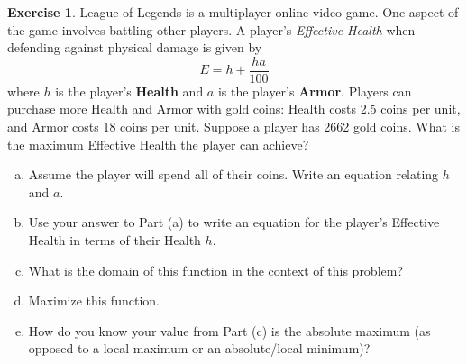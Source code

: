 \documentclass[11pt,reqno,final]{amsart}
\numberwithin{figure}{section}
\theoremstyle{definition} %
\newtheorem{exercise}[question]{Exercise}
\begin{document}
\begin{exercise}
        League of Legends is a multiplayer online video game. One aspect of the game involves battling other players.
        A player's \textit{Effective Health} when defending against physical damage is given by
        \[
                E = h + \dfrac{ha}{100}
        \]
        where $h$ is the player's \textbf{Health} and $a$ is the player's \textbf{Armor}.
        Players can purchase more Health and Armor with gold coins: Health costs 2.5 coins per unit, and Armor costs 18 coins per unit.
        Suppose a player has 2662 gold coins.
        What is the maximum Effective Health the player can achieve?
        \begin{enumerate}[(a)]
        \item Assume the player will spend all of their coins. Write an equation relating $h$ and $a$.
                \vfill
        \item Use your answer to Part (a) to write an equation for the player's Effective Health in terms of their Health $h$.
                \vfill
                \vfill
                \vfill
        \item What is the domain of this function in the context of this problem?
                \vfill
                \newpage
        \item Maximize this function.
                \vfill
                \vfill
        \item How do you know your value from Part (c) is the absolute maximum (as opposed to a local maximum or an absolute/local minimum)?
                \vfill
        \end{enumerate}
\end{exercise}

\newpage
\end{document}

